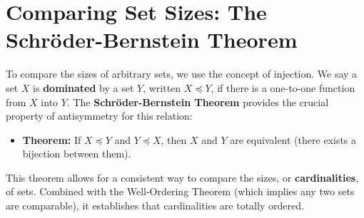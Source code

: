 \documentclass[11pt, a4paper]{article}
\begin{document}
\section{Comparing Set Sizes: The Schröder-Bernstein Theorem}
To compare the sizes of arbitrary sets, we use the concept of injection. We say a set $X$ is \textbf{dominated} by a set $Y$, written $X \preceq Y$, if there is a one-to-one function from $X$ into $Y$. The \textbf{Schröder-Bernstein Theorem} provides the crucial property of antisymmetry for this relation:
\begin{itemize}
    \item \textbf{Theorem:} If $X \preceq Y$ and $Y \preceq X$, then $X$ and $Y$ are equivalent (there exists a bijection between them).
\end{itemize}
This theorem allows for a consistent way to compare the sizes, or \textbf{cardinalities}, of sets. Combined with the Well-Ordering Theorem (which implies any two sets are comparable), it establishes that cardinalities are totally ordered.
\end{document}
